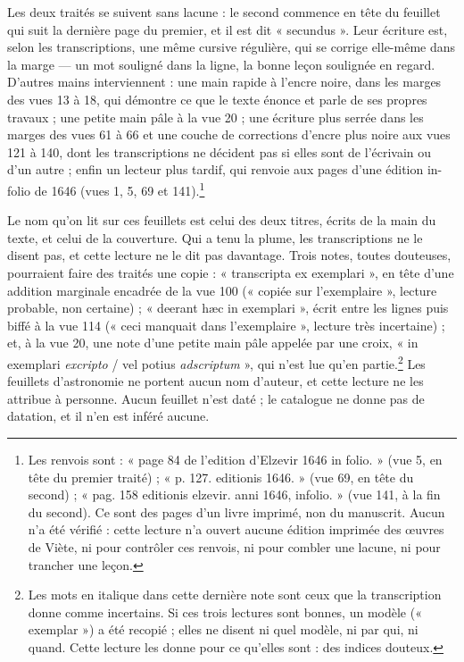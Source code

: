 \documentclass[11pt,a4paper]{article}
\begin{document}
Les deux traités se suivent sans lacune : le second commence en tête du
feuillet qui suit la dernière page du premier, et il est dit « secundus ». Leur
écriture est, selon les transcriptions, une même cursive régulière, qui se
corrige elle-même dans la marge — un mot souligné dans la ligne, la bonne
leçon soulignée en regard. D'autres mains interviennent : une main rapide à
l'encre noire, dans les marges des vues 13 à 18, qui démontre ce que le texte
énonce et parle de ses propres travaux ; une petite main pâle à la vue 20 ; une
écriture plus serrée dans les marges des vues 61 à 66 et une couche de
corrections d'encre plus noire aux vues 121 à 140, dont les transcriptions ne
décident pas si elles sont de l'écrivain ou d'un autre ; enfin un lecteur plus
tardif, qui renvoie aux pages d'une édition in-folio de 1646 (vues 1, 5, 69 et
141).\footnote{Les renvois sont : « page 84 de l'edition d'Elzevir 1646 in
folio. » (vue 5, en tête du premier traité) ; « p. 127. editionis 1646. »
(vue 69, en tête du second) ; « pag. 158 editionis elzevir. anni 1646,
infolio. » (vue 141, à la fin du second). Ce sont des pages d'un livre imprimé,
non du manuscrit. Aucun n'a été vérifié : cette lecture n'a ouvert aucune
édition imprimée des œuvres de Viète, ni pour contrôler ces renvois, ni pour
combler une lacune, ni pour trancher une leçon.}

Le nom qu'on lit sur ces feuillets est celui des deux titres, écrits de la main
du texte, et celui de la couverture. Qui a tenu la plume, les transcriptions ne
le disent pas, et cette lecture ne le dit pas davantage. Trois notes, toutes
douteuses, pourraient faire des traités une copie : « transcripta ex
exemplari », en tête d'une addition marginale encadrée de la vue 100
(« copiée sur l'exemplaire », lecture probable, non certaine) ; « deerant hæc
in exemplari », écrit entre les lignes puis biffé à la vue 114 (« ceci manquait
dans l'exemplaire », lecture très incertaine) ; et, à la vue 20, une note d'une
petite main pâle appelée par une croix, « in exemplari \emph{excripto} / vel
potius \emph{adscriptum} », qui n'est lue qu'en partie.\footnote{Les mots en
italique dans cette dernière note sont ceux que la transcription donne comme
incertains. Si ces trois lectures sont bonnes, un modèle (« exemplar ») a été
recopié ; elles ne disent ni quel modèle, ni par qui, ni quand. Cette lecture
les donne pour ce qu'elles sont : des indices douteux.} Les feuillets
d'astronomie ne portent aucun nom d'auteur, et cette lecture ne les attribue à
personne. Aucun feuillet n'est daté ; le catalogue ne donne pas de datation,
et il n'en est inféré aucune.
\end{document}
